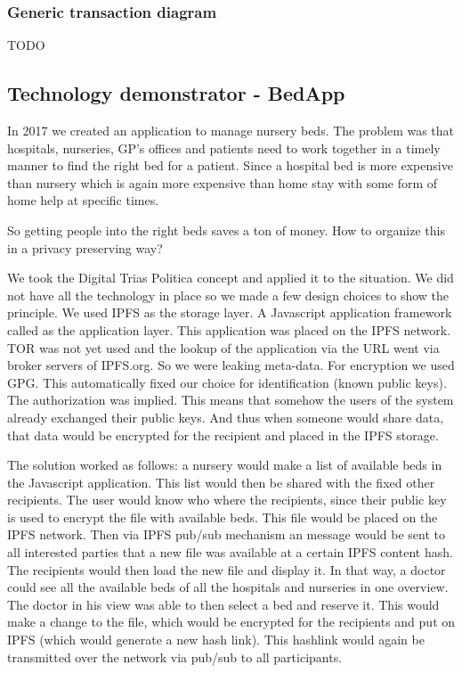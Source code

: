 \documentclass{article}
\begin{document}
\subsubsection{Generic transaction diagram}
TODO

\subsection{Technology demonstrator - BedApp}
In 2017 we created an application to manage nursery beds. The problem was that hospitals, nurseries, GP's offices and patients need to work together in a timely manner to find the right bed for a patient. Since a hospital bed is more expensive than nursery which is again more expensive than home stay with some form of home help at specific times.

So getting people into the right beds saves a ton of money. How to organize this in a privacy preserving way?

We took the Digital Trias Politica concept and applied it to the situation. We did not have all the technology in place so we made a few design choices to show the principle. We used IPFS as the storage layer. A Javascript application framework called  as the application layer. This application was placed on the IPFS network. TOR was not yet used and the lookup of the application via the URL went via broker servers of IPFS.org. So we were leaking meta-data. For encryption we used GPG. This automatically fixed our choice for identification (known public keys). The authorization was implied. This means that somehow the users of the system already exchanged their public keys. And thus when someone would share data, that data would be encrypted for the recipient and placed in the IPFS storage.

The solution worked as follows: a nursery would make a list of available beds in the Javascript application. This list would then be shared with the fixed other recipients. The user would know who where the recipients, since their public key is used to encrypt the file with available beds. This file would be placed on the IPFS network. Then via IPFS pub/sub mechanism an message would be sent to all interested parties that a new file was available at a certain IPFS content hash. The recipients would then load the new file and display it. In that way, a doctor could see all the available beds of all the hospitals and nurseries in one overview. The doctor in his view was able to then select a bed and reserve it. This would make a change to the file, which would be encrypted for the recipients and put on IPFS (which would generate a new hash link). This hashlink would again be transmitted over the network via pub/sub to all participants.
\end{document}
